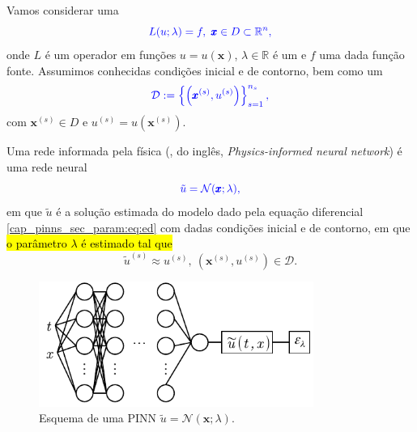 Vamos considerar uma 
\begin{equation}\label{cap_pinns_sec_param:eq:ed}\color{blue}L(u;\lambda) = f, ~\pmb{x}\in D\subset\mathbb{R}^n,
\end{equation}
onde $L$ é um operador em funções $u = u(\pmb{x})$, $\lambda\in\mathbb{R}$ é um  e $f$ uma dada função fonte. Assumimos conhecidas condições inicial e de contorno, bem como um 
\begin{equation}\color{blue}\mathcal{D} := \left\{\left(\pmb{x}^{(s)},u^{(s)}\right)\right\}_{s=1}^{n_s},
\end{equation}
com $\pmb{x}^{(s)}\in D$ e $u^{(s)} = u\left(\pmb{x}^{(s)}\right)$.

Uma rede informada pela física (, do inglês, \textit{Physics-informed neural network})  é uma rede neural
\begin{equation}\color{blue}\tilde{u} = \mathcal{N}(\pmb{x};\lambda),
\end{equation}
em que $\tilde{u}$ é a solução estimada do modelo dado pela equação diferencial \eqref{cap_pinns_sec_param:eq:ed} com dadas condições inicial e de contorno, em que \hl{o parâmetro $\lambda$ é estimado tal que}
\begin{equation}
  \tilde{u}^{(s)} \approx u^{(s)}, ~\left(\pmb{x}^{(s)},u^{(s)}
\right)\in\mathcal{D}.
\end{equation}

\begin{figure}[H]
  \centering
  \includegraphics[width=0.8\textwidth]{cap_pinns/dados/fig_pinns_param/fig}
  \caption{Esquema de uma PINN $\tilde{u} = \mathcal{N}(\pmb{x};\lambda)$.}
  \label{cap_pinns_sec_param:fig:pinn}
\end{figure}

